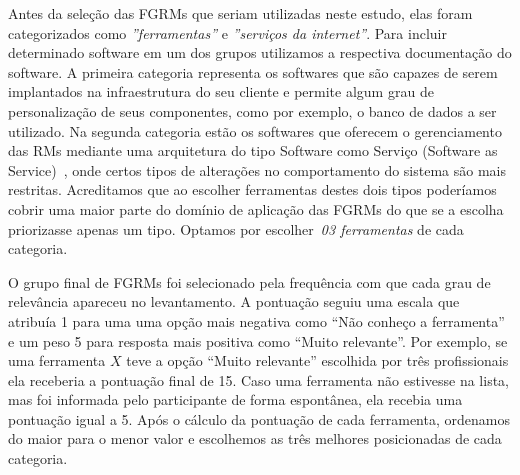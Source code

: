 Antes da seleção das FGRMs que seriam utilizadas neste estudo, elas foram
categorizados como \textit{''ferramentas''} e \textit{''serviços da internet''}.
Para incluir determinado software em um dos grupos utilizamos a respectiva
documentação do software. A primeira categoria representa os softwares que são
capazes de serem implantados na infraestrutura do seu cliente e permite algum
grau de personalização de seus componentes, como por exemplo, o banco de dados a
ser utilizado. Na segunda categoria estão os softwares que oferecem o
gerenciamento das RMs mediante uma arquitetura do tipo Software como Serviço
(Software as Service)~\cite{fox2013engineering}, onde certos tipos de alterações
no comportamento do sistema são mais restritas. Acreditamos que ao escolher
ferramentas destes dois tipos poderíamos cobrir uma maior parte do domínio de
aplicação das FGRMs do que se a escolha priorizasse apenas um tipo. Optamos por
escolher~\textit{03 ferramentas} de cada categoria.


O grupo final de FGRMs foi selecionado pela frequência com que cada grau de
relevância apareceu no levantamento. A pontuação seguiu uma escala que atribuía
1 para uma uma opção mais negativa como ``Não conheço a ferramenta'' e um peso 5
para resposta mais positiva como ``Muito relevante''.  Por exemplo, se uma
ferramenta $X$ teve a opção ``Muito relevante'' escolhida por três profissionais
ela receberia a pontuação final de 15. Caso uma ferramenta não estivesse na
lista, mas foi informada pelo participante de forma espontânea, ela recebia uma
pontuação igual a 5. Após o cálculo da pontuação de cada ferramenta, ordenamos
do maior para o menor valor e escolhemos as três melhores posicionadas de cada
categoria.


